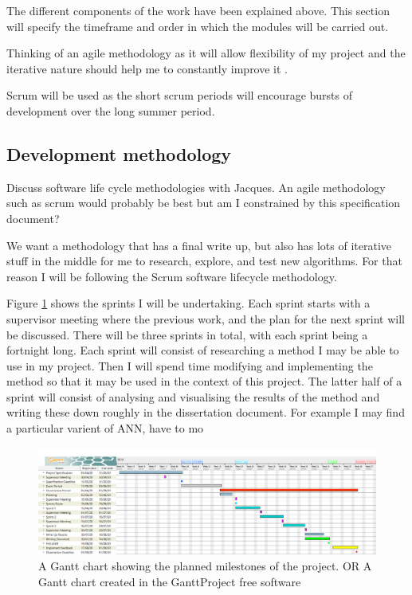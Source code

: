 \documentclass{article}
\begin{document}
The different components of the work have been explained above.
This section will specify the timeframe and order in which the modules will be carried out.

Thinking of an agile methodology as it will allow flexibility of my project and the iterative nature should help me to constantly improve it \cite{beck2001manifesto}. 

Scrum will be used as the short scrum periods will encourage bursts of development over the long summer period.

\subsection{Development methodology}
Discuss software life cycle methodologies with Jacques.
An agile methodology such as scrum would probably be best but am I constrained  by this specification document?

We want a methodology that has a final write up, but also has lots of iterative stuff in the middle for me to research, explore, and test new algorithms.
For that reason I will be following the Scrum software lifecycle methodology.


Figure \ref{fig:Gantt} shows the sprints I will be undertaking.
Each sprint starts with a supervisor meeting where the previous work, and the plan for the next sprint will be discussed.
There will be three sprints in total, with each sprint being a fortnight long.
Each sprint will consist of researching a method I may be able to use in my project.
Then I will spend time modifying and implementing the method so that it may be used in the context of this project.
The latter half of a sprint will consist of analysing and visualising the results of the method and writing these down roughly in the dissertation document.
For example I may find a particular varient of ANN, have to mo  


\begin{figure}[ht]
    \centering
    \centerline{
        \includegraphics[scale=0.3]{GanttChart.PNG}
    }
    \caption{A Gantt chart showing the planned milestones of the project. OR A Gantt chart created in the GanttProject free software}
    \label{fig:Gantt}
\end{figure}
\end{document}
